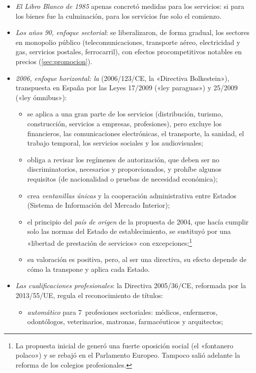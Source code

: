 \documentclass[11pt]{article}
\begin{document}
\begin{itemize}
\item \emph{El Libro Blanco de 1985} apenas concretó medidas para los servicios: si para los bienes fue la culminación, para los servicios fue solo el comienzo.
\item \emph{Los años 90, enfoque sectorial}: se liberalizaron, de forma gradual, los sectores en monopolio público (telecomunicaciones, transporte aéreo, electricidad y gas, servicios postales, ferrocarril), con efectos procompetitivos notables en precios (\ref{sec:promocion}).
\item \emph{2006, enfoque horizontal: la } (2006/123/CE, la «Directiva Bolkestein»), transpuesta en España por las Leyes 17/2009 («ley paraguas») y 25/2009 («ley ómnibus»)\nocite{UE2006Servicios}:
  \begin{itemize}
  \item se aplica a una gran parte de los servicios (distribución, turismo, construcción, servicios a empresas, profesiones), pero excluye los financieros, las comunicaciones electrónicas, el transporte, la sanidad, el trabajo temporal, los servicios sociales y los audiovisuales;
  \item obliga a revisar los regímenes de autorización, que deben ser no discriminatorios, necesarios y proporcionados, y prohíbe algunos requisitos (de nacionalidad o pruebas de necesidad económica);
  \item crea \emph{ventanillas únicas} y la cooperación administrativa entre Estados (Sistema de Información del Mercado Interior);
  \item el principio del \emph{país de origen} de la propuesta de 2004, que hacía cumplir solo las normas del Estado de establecimiento, se sustituyó por una «libertad de prestación de servicios» con excepciones;\footnote{La propuesta inicial de  generó una fuerte oposición social (el «fontanero polaco») y se rebajó en el Parlamento Europeo. Tampoco salió adelante la reforma de los colegios profesionales.}
  \item su valoración es positiva, pero, al ser una directiva, su efecto depende de cómo la transpone y aplica cada Estado.
  \end{itemize}
\item \emph{Las cualificaciones profesionales}: la Directiva 2005/36/CE, reformada por la 2013/55/UE, regula el reconocimiento de títulos:
  \begin{itemize}
  \item \emph{automático} para 7~profesiones sectoriales: médicos, enfermeros, odontólogos, veterinarios, matronas, farmacéuticos y arquitectos;

\end{itemize}
\end{itemize}
\end{document}
